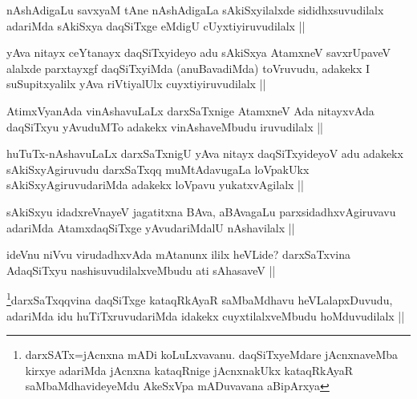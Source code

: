 
\begin{artha}
nAshAdigaLu savxyaM tAne nAshAdigaLa sAkiSxyilalxde sididhxsuvudilalx adariMda sAkiSxya daqSiTxge eMdigU cUyxtiyiruvudilalx ||
\end{artha}


\begin{artha}
yAva nitayx ceYtanayx daqSiTxyideyo adu sAkiSxya AtamxneV savxrUpaveV alalxde parxtayxgf daqSiTxyiMda (anuBavadiMda) toVruvudu, adakekx I suSupitxyalilx yAva riVtiyalUlx cuyxtiyiruvudilalx ||
\end{artha}

\begin{artha}
AtimxVyanAda vinAshavuLaLx darxSaTxnige AtamxneV Ada nitayxvAda daqSiTxyu yAvuduMTo adakekx vinAshaveMbudu iruvudilalx ||
\end{artha}

\begin{artha}
huTuTx-nAshavuLaLx darxSaTxnigU yAva nitayx daqSiTxyideyoV adu adakekx sAkiSxyAgiruvudu darxSaTxqq muMtAdavugaLa loVpakUkx sAkiSxyAgiruvudariMda adakekx loVpavu yukatxvAgilalx ||
\end{artha}

\begin{artha}
sAkiSxyu idadxreVnayeV jagatitxna BAva, aBAvagaLu parxsidadhxvAgiruvavu adariMda AtamxdaqSiTxge yAvudariMdalU nAshavilalx ||
\end{artha}


\begin{artha}
ideVnu niVvu virudadhxvAda mAtanunx ililx heVLide? darxSaTxvina AdaqSiTxyu nashisuvudilalxveMbudu ati sAhasaveV ||
\end{artha}


\begin{artha}
\footnote{darxSATx=jAcnxna mADi koLuLxvavanu. daqSiTxyeMdare jAcnxnaveMba kirxye adariMda jAcnxna kataqRnige jAcnxnakUkx kataqRkAyaR saMbaMdhavideyeMdu AkeSxVpa mADuvavana aBipArxya}darxSaTxqqvina daqSiTxge kataqRkAyaR saMbaMdhavu heVLalapxDuvudu, adariMda idu huTiTxruvudariMda idakekx cuyxtilalxveMbudu hoMduvudilalx ||
\end{artha}


